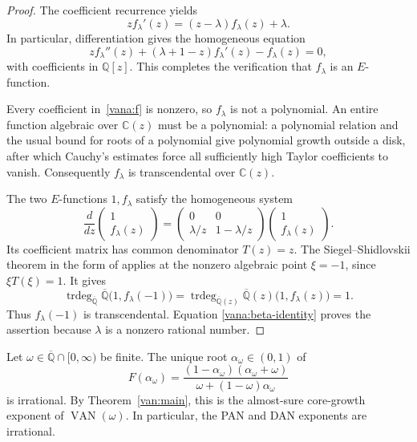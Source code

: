 \begin{proof}
The coefficient recurrence yields
\begin{equation}\label{vana:first-order}
 z f_\lambda'(z)=(z-\lambda)f_\lambda(z)+\lambda.
\end{equation}
In particular, differentiation gives the homogeneous equation
\[
 z f_\lambda''(z)+(\lambda+1-z)f_\lambda'(z)-f_\lambda(z)=0,
\]
with coefficients in $\mathbb Q[z]$.  This completes the verification
that $f_\lambda$ is an $E$-function.

Every coefficient in~\eqref{vana:f} is nonzero, so $f_\lambda$ is
not a polynomial.  An entire function algebraic over $\mathbb C(z)$
must be a polynomial: a polynomial relation and the usual bound for
roots of a polynomial give polynomial growth outside a disk, after
which Cauchy's estimates force all sufficiently high Taylor
coefficients to vanish.  Consequently $f_\lambda$ is transcendental
over $\mathbb C(z)$.

The two $E$-functions $1,f_\lambda$ satisfy the homogeneous system
\begin{equation}\label{vana:system}
 \frac{d}{dz}
 \begin{pmatrix}1\\f_\lambda(z)\end{pmatrix}
 =
 \begin{pmatrix}
  0&0\\
  \lambda/z&1-\lambda/z
 \end{pmatrix}
 \begin{pmatrix}1\\f_\lambda(z)\end{pmatrix}.
\end{equation}
Its coefficient matrix has common denominator $T(z)=z$.
The Siegel--Shidlovskii theorem in the form of
\cite[Theorem~1.1]{Beukers2006} applies at the nonzero algebraic
point $\xi=-1$, since $\xi T(\xi)=1$.  It gives
\[
 \operatorname{trdeg}_{\overline{\mathbb Q}}
    \overline{\mathbb Q}\bigl(1,f_\lambda(-1)\bigr)
 =
 \operatorname{trdeg}_{\overline{\mathbb Q}(z)}
    \overline{\mathbb Q}(z)\bigl(1,f_\lambda(z)\bigr)
 =1.
\]
Thus $f_\lambda(-1)$ is transcendental.  Equation
\eqref{vana:beta-identity} proves the assertion because
$\lambda$ is a nonzero rational number.
\end{proof}

\begin{theorem}
\label{vana:irrationality}
Let $\omega\in\overline{\mathbb Q}\cap[0,\infty)$ be finite.
The unique root $\alpha_\omega\in(0,1)$ of
\begin{equation}\label{vana:root}
 F(\alpha_\omega)
 =\frac{(1-\alpha_\omega)(\alpha_\omega+\omega)}
        {\omega+(1-\omega)\alpha_\omega}
\end{equation}
is irrational.  By Theorem~\ref{van:main}, this is the almost-sure core-growth
exponent of $\operatorname{VAN}(\omega)$.  In
particular, the PAN and DAN exponents are irrational.
\end{theorem}

